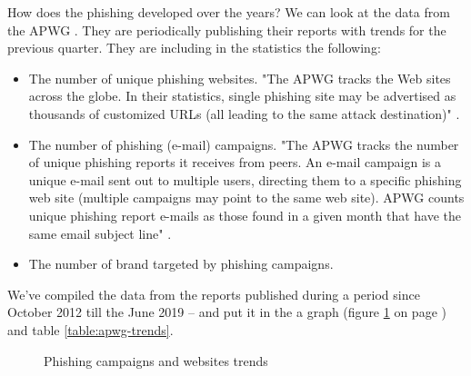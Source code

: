 \documentclass[
  digital, %
  oneside, %
  table,   %
  nolof,     %
  nolot,     %
]{fithesis3}
\begin{document}
How does the phishing developed over the years? We can look at the data from the APWG \cite{apwg-2019-2}. They are periodically publishing their reports with trends for the previous quarter. They are including in the statistics the following:
\begin{itemize}
    \item The number of unique phishing websites. "The APWG tracks the Web sites across the globe. In their statistics, single phishing site may be advertised as thousands of customized URLs (all leading to the same attack destination)" \cite{apwg-2019-2}.
    \item The number of phishing (e-mail) campaigns. "The APWG tracks the number of unique phishing reports it receives from peers. An e-mail campaign is a unique e-mail sent out to multiple users, directing them to a specific phishing web site (multiple campaigns may point to the same web site). APWG counts unique phishing report e-mails as those found in a given month that have the same email subject line" \cite{apwg-2019-2}.
    \item The number of brand targeted by phishing campaigns. \cite{apwg-2019-2}
\end{itemize}

We've compiled the data from the reports published during a period since October 2012 till the June 2019 \cite{apwg-2012-4}--\cite{apwg-2019-2} and put it in the a graph (figure \ref{fig:apwg-trends} on page \pageref{fig:apwg-trends}) and table \ref{table:apwg-trends}.


\begin{figure}[]
    \centering
    \caption{Phishing campaigns and websites trends}
    \label{fig:apwg-trends}
\end{figure}
\end{document}
